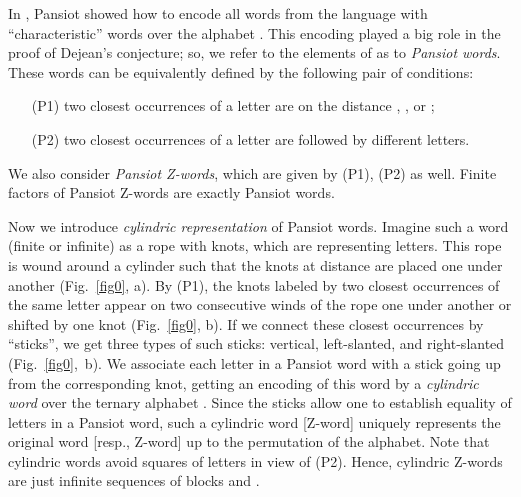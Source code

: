 \documentclass[submission,copyright]{eptcs}\providecommand{\event}{WORDS 2011}
\begin{document}
\smallskip
In \cite{Pan}, Pansiot showed how to encode all words from the language  with ``characteristic'' words over the alphabet . This encoding played a big role in the proof of Dejean's conjecture; so, we refer to the elements of  as to \textit{Pansiot words}. These words can be equivalently defined by the following pair of conditions:
\begin{itemize}
\item[(P1)] two closest occurrences of a letter are on the distance , , or ;
\item[(P2)] two closest occurrences of a letter are followed by different letters.
\end{itemize}
We also consider \textit{Pansiot Z-words}, which are given by (P1), (P2) as well. Finite factors of Pansiot Z-words are exactly Pansiot words.

Now we introduce \textit{cylindric representation} of Pansiot words. Imagine such a word (finite or infinite) as a rope with knots, which are representing letters. This rope is wound around a cylinder such that the knots at distance  are placed one under another (Fig.~\ref{fig0}, a). By (P1), the knots labeled by two closest occurrences of the same letter appear on two consecutive winds of the rope one under another or shifted by one knot (Fig.~\ref{fig0}, b). If we connect these closest occurrences by ``sticks'', we get three types of such sticks: vertical, left-slanted, and right-slanted (Fig.~\ref{fig0},~b). We associate each letter in a Pansiot word with a stick going up from the corresponding knot, getting an encoding of this word by a \textit{cylindric word} over the ternary alphabet . Since the sticks allow one to establish equality of letters in a Pansiot word, such a cylindric word [Z-word] uniquely represents the original word [resp., Z-word] up to the permutation of the alphabet. Note that cylindric words avoid squares of letters in view of (P2). Hence, cylindric Z-words are just infinite sequences of blocks  and .
\end{document}

